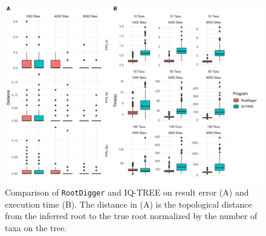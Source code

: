 \documentclass{article}
\newcommand{\RootDiggertt}{\texttt{RootDigger}}
\begin{document}

\begin{figure}
  \begin{center}
    \includegraphics[width=\linewidth]{./figs/time_distance_boxplot.png}
    \caption{Comparison of \RootDiggertt{} and IQ-TREE on result error (A) and
      execution time (B). The distance in (A) is the topological distance from
      the inferred root to the true root normalized by the number of taxa on the
      tree.
    \label{fig:timing-box-plot}}
\end{center}
\end{figure}


\end{document}
